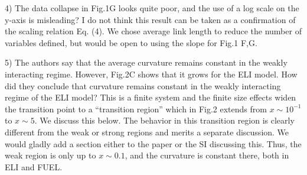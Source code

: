\documentclass[11pt]{article}
\begin{document}
\begin{response}{
4) The data collapse in Fig.1G looks quite poor, and the use of a log scale on the y-axis is misleading? I do not think this result can be taken as a confirmation of the scaling relation Eq. (4). 
}
We chose average link length to reduce the number of variables defined, but would be open to using the slope for Fig.1 F,G. 
\end{response}
\begin{response}{
5) The authors say that the average curvature remains constant in the weakly interacting regime. However, Fig.2C shows that it grows for the ELI model. How did they conclude that curvature remains constant in the weakly interacting regime of the ELI model?
}
This is a finite system and the finite size effects widen the transition point to a ``transition region'' which in Fig.2 extends from $x\sim 10^{-1}$ to $x\sim 5$. 
We discuss this below.
The behavior in this transition region is clearly different from the weak or strong regions and merits a separate discussion. 
We would gladly add a section either to the paper or the SI discussing this.
Thus, the weak region is only up to $x\sim 0.1$, and the curvature is constant there, both in ELI and FUEL.


 
\end{response}
\end{document}
